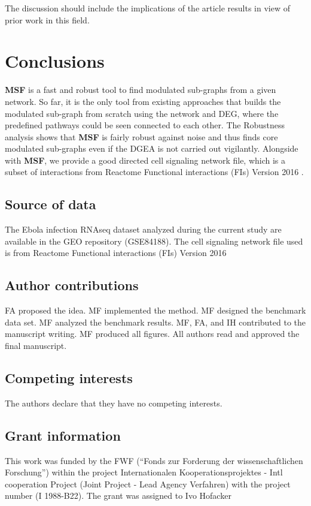 \documentclass[twocolumn]{article}
\begin{document}
The discussion should include the implications of the article results
in view of prior work in this field.

\section*{Conclusions}

\textbf{MSF} is a fast and robust tool to find modulated sub-graphs from a given network. So far, it is the only tool from existing approaches that builds the modulated sub-graph from scratch using the network and DEG, where the predefined pathways could be seen connected to each other. The Robustness analysis shows that \textbf{MSF} is fairly robust against noise and thus finds core modulated sub-graphs even if the DGEA is not carried out vigilantly. Alongside with \textbf{MSF}, we provide a good directed cell signaling network file, which is a subset of interactions from Reactome Functional interactions (FIs)
Version 2016 .

\subsection*{Source of data}

The Ebola infection RNAseq dataset analyzed during the current study are
available in the GEO repository (GSE84188). The cell signaling
network file used is from Reactome Functional interactions (FIs)
Version 2016


\subsection*{Author contributions}
FA proposed the idea. MF implemented the method. MF designed the benchmark
data set. MF analyzed the benchmark results. MF, FA, and IH contributed to
the manuscript writing. MF produced all figures. All authors read and
approved the final manuscript.

\subsection*{Competing interests}

The authors declare that they have no competing interests.


\subsection*{Grant information}

This work was funded by the FWF (“Fonds zur Forderung der wissenschaftlichen Forschung”) within the project Internationalen Kooperationsprojektes - Intl cooperation Project (Joint Project - Lead Agency Verfahren) with the project number (I 1988-B22). The grant was assigned to Ivo Hofacker
\end{document}

